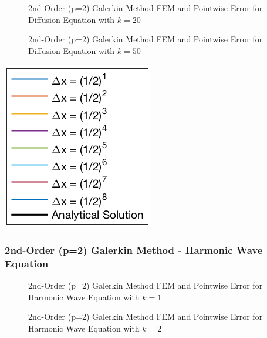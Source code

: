 \documentclass[10pt]{article}		%
\numberwithin{equation}{section}
\begin{document}
\begin{figure}[H]
	\begin{center}
		\caption{2nd-Order (p=2) Galerkin Method FEM and Pointwise Error for Diffusion Equation with $k = 20$}
	\end{center}
\end{figure}

\begin{figure}[H]
	\begin{center}
		\caption{2nd-Order (p=2) Galerkin Method FEM and Pointwise Error for Diffusion Equation with $k = 50$}
	\end{center}
\end{figure}

\begin{center}
	\includegraphics[height = 0.11\linewidth]{legend}
\end{center}

\newpage

\subsubsection{2nd-Order (p=2) Galerkin Method - Harmonic Wave Equation}

\begin{figure}[H]
	\begin{center}
		\caption{2nd-Order (p=2) Galerkin Method FEM and Pointwise Error for Harmonic Wave Equation with $k = 1$}
	\end{center}
\end{figure}

\begin{figure}[H]
	\begin{center}
		\caption{2nd-Order (p=2) Galerkin Method FEM and Pointwise Error for Harmonic Wave Equation with $k = 2$}
	\end{center}
\end{figure}
\end{document}
